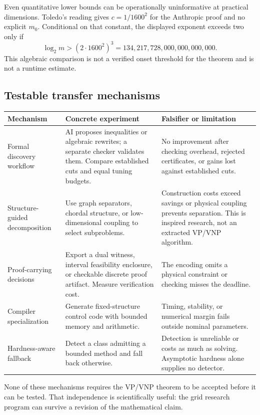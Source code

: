 \documentclass[11pt,letterpaper]{article}
\begin{document}
Even quantitative lower bounds can be operationally uninformative at practical dimensions. Toledo's reading gives $c=1/1600^2$ for the Anthropic proof and no explicit $m_0$.\cite{toledo} Conditional on that constant, the displayed exponent exceeds two only if
\[
 \log_2m>(2\cdot1600^2)^3
   =134{,}217{,}728{,}000{,}000{,}000{,}000.
\]
This algebraic comparison is not a verified onset threshold for the theorem and is not a runtime estimate.

\subsection{Testable transfer mechanisms}
\begin{longtable}{P{.19\linewidth}P{.37\linewidth}P{.35\linewidth}}
\toprule Mechanism & Concrete experiment & Falsifier or limitation\\\midrule\endhead
Formal discovery workflow & AI proposes inequalities or algebraic rewrites; a separate checker validates them. Compare established cuts and equal tuning budgets. & No improvement after checking overhead, rejected certificates, or gains lost against established cuts.\\
Structure-guided decomposition & Use graph separators, chordal structure, or low-dimensional coupling to select subproblems. & Construction costs exceed savings or physical coupling prevents separation. This is inspired research, not an extracted VP/VNP algorithm.\\
Proof-carrying decisions & Export a dual witness, interval feasibility enclosure, or checkable discrete proof artifact. Measure verification cost. & The encoding omits a physical constraint or checking misses the deadline.\\
Compiler specialization & Generate fixed-structure control code with bounded memory and arithmetic. & Timing, stability, or numerical margin fails outside nominal parameters.\\
Hardness-aware fallback & Detect a class admitting a bounded method and fall back otherwise. & Detection is unreliable or costs as much as solving. Asymptotic hardness alone supplies no detector.\\
\bottomrule
\end{longtable}
None of these mechanisms requires the VP/VNP theorem to be accepted before it can be tested. That independence is scientifically useful: the grid research program can survive a revision of the mathematical claim.
\end{document}
